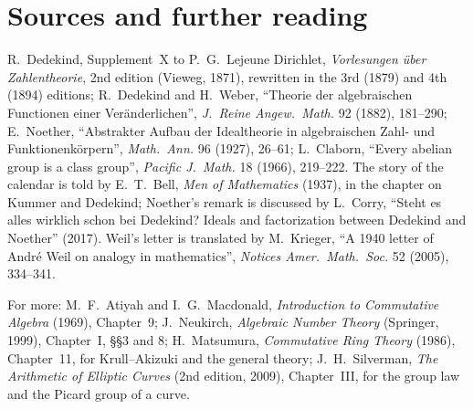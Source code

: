 \section*{Sources and further reading}

R.~Dedekind, Supplement~X to P.~G.~Lejeune Dirichlet, \emph{Vorlesungen über Zahlentheorie}, 2nd edition (Vieweg, 1871), rewritten in the 3rd (1879) and 4th (1894) editions; R.~Dedekind and H.~Weber, ``Theorie der algebraischen
Functionen einer Veränderlichen'', \emph{J.\ Reine Angew.\ Math.} 92 (1882), 181--290; E.~Noether, ``Abstrakter Aufbau der Idealtheorie in algebraischen Zahl- und Funktionenkörpern'', \emph{Math.\ Ann.} 96 (1927), 26--61;
L.~Claborn, ``Every abelian group is a class group'', \emph{Pacific J.\ Math.} 18 (1966), 219--222. The story of the calendar is told by E.~T.~Bell, \emph{Men of Mathematics} (1937), in the chapter on Kummer and Dedekind;
Noether's remark is discussed by L.~Corry, ``Steht es alles wirklich schon bei Dedekind? Ideals and factorization between Dedekind and Noether'' (2017). Weil's letter is translated by M.~Krieger, ``A 1940 letter of André Weil on
analogy in mathematics'', \emph{Notices Amer.\ Math.\ Soc.} 52 (2005), 334--341.

For more: M.~F.~Atiyah and I.~G.~Macdonald, \emph{Introduction to Commutative Algebra} (1969), Chapter~9; J.~Neukirch, \emph{Algebraic Number Theory} (Springer, 1999), Chapter~I, \S\S3 and 8; H.~Matsumura, \emph{Commutative Ring Theory}
(1986), Chapter~11, for Krull--Akizuki and the general theory; J.~H.~Silverman, \emph{The Arithmetic of Elliptic Curves} (2nd edition, 2009), Chapter~III, for the group law and the Picard group of a curve.
